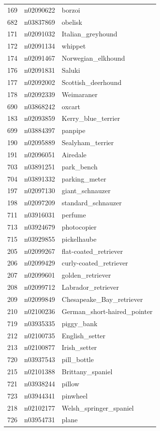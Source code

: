 \begin{table}
\begin{tabular}{cll}
169 & n02090622 & borzoi \\
682 & n03837869 & obelisk \\
171 & n02091032 & Italian_greyhound \\
172 & n02091134 & whippet \\
174 & n02091467 & Norwegian_elkhound \\
176 & n02091831 & Saluki \\
177 & n02092002 & Scottish_deerhound \\
178 & n02092339 & Weimaraner \\
690 & n03868242 & oxcart \\
183 & n02093859 & Kerry_blue_terrier \\
699 & n03884397 & panpipe \\
190 & n02095889 & Sealyham_terrier \\
191 & n02096051 & Airedale \\
703 & n03891251 & park_bench \\
704 & n03891332 & parking_meter \\
197 & n02097130 & giant_schnauzer \\
198 & n02097209 & standard_schnauzer \\
711 & n03916031 & perfume \\
713 & n03924679 & photocopier \\
715 & n03929855 & pickelhaube \\
205 & n02099267 & flat-coated_retriever \\
206 & n02099429 & curly-coated_retriever \\
207 & n02099601 & golden_retriever \\
208 & n02099712 & Labrador_retriever \\
209 & n02099849 & Chesapeake_Bay_retriever \\
210 & n02100236 & German_short-haired_pointer \\
719 & n03935335 & piggy_bank \\
212 & n02100735 & English_setter \\
213 & n02100877 & Irish_setter \\
720 & n03937543 & pill_bottle \\
215 & n02101388 & Brittany_spaniel \\
721 & n03938244 & pillow \\
723 & n03944341 & pinwheel \\
218 & n02102177 & Welsh_springer_spaniel \\
726 & n03954731 & plane \\

\end{tabular}
\end{table}
